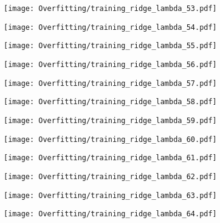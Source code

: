 \documentclass[xcolor=pdftex,dvipsnames,table]{beamer}
\begin{document}
\frame
{
	\begin{center}
		\texttt{[image: Overfitting/training\_ridge\_lambda\_53.pdf]}
	\end{center}
}

\frame
{
	\begin{center}
		\texttt{[image: Overfitting/training\_ridge\_lambda\_54.pdf]}
	\end{center}
}

\frame
{
	\begin{center}
		\texttt{[image: Overfitting/training\_ridge\_lambda\_55.pdf]}
	\end{center}
}

\frame
{
	\begin{center}
		\texttt{[image: Overfitting/training\_ridge\_lambda\_56.pdf]}
	\end{center}
}

\frame
{
	\begin{center}
		\texttt{[image: Overfitting/training\_ridge\_lambda\_57.pdf]}
	\end{center}
}

\frame
{
	\begin{center}
		\texttt{[image: Overfitting/training\_ridge\_lambda\_58.pdf]}
	\end{center}
}

\frame
{
	\begin{center}
		\texttt{[image: Overfitting/training\_ridge\_lambda\_59.pdf]}
	\end{center}
}

\frame
{
	\begin{center}
		\texttt{[image: Overfitting/training\_ridge\_lambda\_60.pdf]}
	\end{center}
}

\frame
{
	\begin{center}
		\texttt{[image: Overfitting/training\_ridge\_lambda\_61.pdf]}
	\end{center}
}

\frame
{
	\begin{center}
		\texttt{[image: Overfitting/training\_ridge\_lambda\_62.pdf]}
	\end{center}
}

\frame
{
	\begin{center}
		\texttt{[image: Overfitting/training\_ridge\_lambda\_63.pdf]}
	\end{center}
}

\frame
{
	\begin{center}
		\texttt{[image: Overfitting/training\_ridge\_lambda\_64.pdf]}
	\end{center}
}
\end{document}

